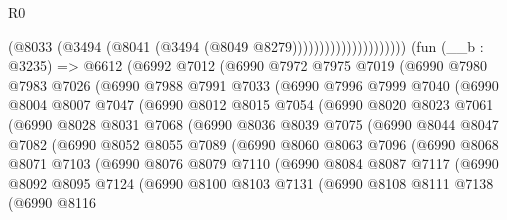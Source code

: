 \begin{lexlean}{R0}
\begin{coremodule}
                                    (@8033 (@3494 (@8041 (@3494 (@8049 @8279)))))))))))))))))))))
    (fun (__b : @3235) =>
    @6612
      (@6992
        @7012
        (@6990
          @7972
          @7975
          @7019
          (@6990
            @7980
            @7983
            @7026
            (@6990
              @7988
              @7991
              @7033
              (@6990
                @7996
                @7999
                @7040
                (@6990
                  @8004
                  @8007
                  @7047
                  (@6990
                    @8012
                    @8015
                    @7054
                    (@6990
                      @8020
                      @8023
                      @7061
                      (@6990
                        @8028
                        @8031
                        @7068
                        (@6990
                          @8036
                          @8039
                          @7075
                          (@6990
                            @8044
                            @8047
                            @7082
                            (@6990
                              @8052
                              @8055
                              @7089
                              (@6990
                                @8060
                                @8063
                                @7096
                                (@6990
                                  @8068
                                  @8071
                                  @7103
                                  (@6990
                                    @8076
                                    @8079
                                    @7110
                                    (@6990
                                      @8084
                                      @8087
                                      @7117
                                      (@6990
                                        @8092
                                        @8095
                                        @7124
                                        (@6990
                                          @8100
                                          @8103
                                          @7131
                                          (@6990
                                            @8108
                                            @8111
                                            @7138
                                            (@6990
                                              @8116

\end{coremodule}
\end{lexlean}
